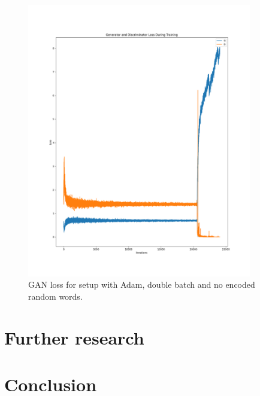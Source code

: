 \documentclass{article}
\begin{document}
\begin{figure}[h]
    \captionsetup{width=\textwidth}
    \includegraphics[width=\textwidth,height=12cm]{GAN-loss-double_batch-Adam-no_random.png}
    \caption{%
        GAN loss for setup with Adam, double batch and no encoded random words.
    }\label{fig:doubleBatchAdamNoRandom}
\end{figure}

\section{Further research}\label{sec:furtherResearch}


\section{Conclusion}\label{sec:conclusion}


\newpage
\printbibliography%
\end{document}
